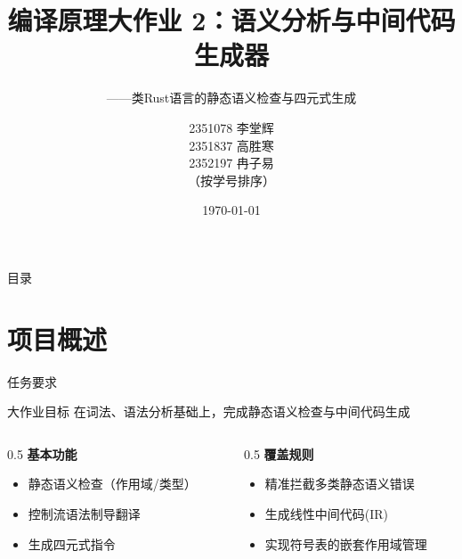 \documentclass[aspectratio=169]{ctexbeamer}
\title[Compilation Principles]{%
    编译原理大作业 2：语义分析与中间代码生成器
}
\subtitle{——类Rust语言的静态语义检查与四元式生成}
\author[李堂辉, 高胜寒, 冉子易]{%
    2351078 李堂辉 \\ 2351837 高胜寒 \\ 2352197 冉子易 \\ \small （按学号排序）
}
\institute[Tongji University]{
    同济大学
}
\date{\today}
\begin{document}
\begin{frame}
    \titlepage
\end{frame}

\begin{frame}{目录}
    \tableofcontents
\end{frame}

\section{项目概述}

\begin{frame}{任务要求}
    \begin{block}{大作业目标}
        在词法、语法分析基础上，完成静态语义检查与中间代码生成
    \end{block}
    \vfill
    \begin{columns}[T]
        \begin{column}{0.5\textwidth}
            \textbf{基本功能}
            \begin{itemize}
                \item 静态语义检查（作用域/类型）
                \item 控制流语法制导翻译
                \item 生成四元式指令
            \end{itemize}
        \end{column}
        \begin{column}{0.5\textwidth}
            \textbf{覆盖规则}
            \begin{itemize}
                \item 精准拦截多类静态语义错误
                \item 生成线性中间代码(IR)
                \item 实现符号表的嵌套作用域管理
            \end{itemize}
        \end{column}
    \end{columns}
\end{frame}
\end{document}
